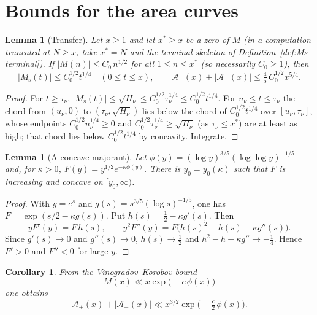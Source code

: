 \documentclass[11pt]{amsart}
\numberwithin{equation}{section}
\theoremstyle{plain}
\newtheorem{lemma}[theorem]{Lemma}
\newtheorem{corollary}[theorem]{Corollary}
\theoremstyle{definition}
\theoremstyle{remark}
\newcommand{\Ms}{M_{\mathrm{s}}}
\newcommand{\Ap}{\mathcal{A}_{+}}
\newcommand{\Am}{\mathcal{A}_{-}}
\begin{document}
\section{Bounds for the area curves}
\label{sec:bounds}

\begin{lemma}[Transfer]
\label{lem:transfer}
Let $x\ge1$ and let $x^*\ge x$ be a zero of $M$ (in a computation truncated
at $N\ge x$, take $x^*=N$ and the terminal skeleton of
Definition~\ref{def:Ms-terminal}). If $|M(n)|\le C_0\,n^{1/2}$ for all
$1\le n\le x^*$ (so necessarily $C_0\ge1$), then
\begin{equation}
\label{eq:transfer_bound}
  |\Ms(t)|\le C_0^{1/2}t^{1/4}\quad(0\le t\le x),\qquad
  \Ap(x)+|\Am(x)|\le\tfrac45\,C_0^{1/2}x^{5/4}.
\end{equation}
\end{lemma}

\begin{proof}
For $t\ge\tau_\nu$, $|\Ms(t)|\le\sqrt{H_\nu}\le C_0^{1/2}\tau_\nu^{1/4}\le
C_0^{1/2}t^{1/4}$. For $u_\nu\le t\le\tau_\nu$ the chord from $(u_\nu,0)$ to
$(\tau_\nu,\sqrt{H_\nu})$ lies below the chord of $C_0^{1/2}t^{1/4}$ over
$[u_\nu,\tau_\nu]$, whose endpoints $C_0^{1/2}u_\nu^{1/4}\ge0$ and
$C_0^{1/2}\tau_\nu^{1/4}\ge\sqrt{H_\nu}$ (as $\tau_\nu\le x^*$) are at
least as high; that chord lies below $C_0^{1/2}t^{1/4}$ by concavity.
Integrate.
\end{proof}

\begin{lemma}[A concave majorant]
\label{lem:concave-majorant}
Let $\phi(y)=(\log y)^{3/5}(\log\log y)^{-1/5}$ and, for $\kappa>0$,
$F(y)=y^{1/2}e^{-\kappa\phi(y)}$. There is $y_0=y_0(\kappa)$ such that $F$
is increasing and concave on $[y_0,\infty)$.
\end{lemma}

\begin{proof}
With $y=e^s$ and $g(s)=s^{3/5}(\log s)^{-1/5}$, one has
$F=\exp(s/2-\kappa g(s))$. Put $h(s)=\frac12-\kappa g'(s)$. Then
\[
yF'(y)=F\,h(s),\qquad
y^2F''(y)=F\bigl(h(s)^2-h(s)-\kappa g''(s)\bigr).
\]
Since $g'(s)\to0$ and $g''(s)\to0$, $h(s)\to\frac12$ and
$h^2-h-\kappa g''\to-\frac14$. Hence $F'>0$ and $F''<0$ for large $y$.
\end{proof}

\begin{corollary}
\label{cor:uncond}
From the Vinogradov--Korobov bound \cite{Walfisz1963}
\begin{equation}
\label{eq:VK_M}
  M(x)\ll x\exp\bigl(-c\,\phi(x)\bigr)
\end{equation}
one obtains
\begin{equation}
\label{eq:uncond_area}
  \Ap(x)+|\Am(x)|\ll x^{3/2}\exp\bigl(-\tfrac c2\,\phi(x)\bigr).
\end{equation}
\end{corollary}
\end{document}
